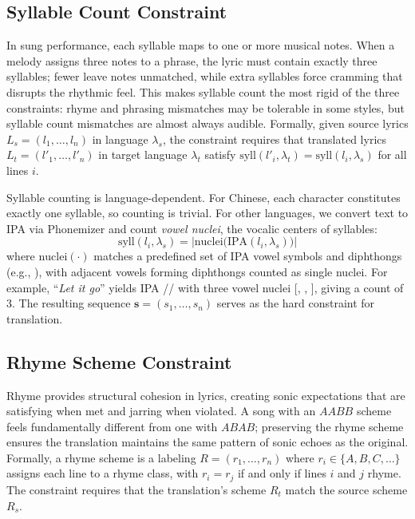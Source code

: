 \documentclass[11pt]{article}
\begin{document}
\subsection{Syllable Count Constraint}
\label{sec:syllable-count}

In sung performance, each syllable maps to one or more musical notes.
When a melody assigns three notes to a phrase, the lyric must contain exactly three syllables; fewer leave notes unmatched, while extra syllables force cramming that disrupts the rhythmic feel.
This makes syllable count the most rigid of the three constraints: rhyme and phrasing mismatches may be tolerable in some styles, but syllable count mismatches are almost always audible.
Formally, given source lyrics $L_s = (l_1, \ldots, l_n)$ in language $\lambda_s$, the constraint requires that translated lyrics $L_t = (l'_1, \ldots, l'_n)$ in target language $\lambda_t$ satisfy $\text{syll}(l'_i, \lambda_t) = \text{syll}(l_i, \lambda_s)$ for all lines $i$.

Syllable counting is language-dependent.
For Chinese, each character constitutes exactly one syllable, so counting is trivial.
For other languages, we convert text to IPA via Phonemizer \citep{bernard-titeux-2021-phonemizer} and count \emph{vowel nuclei}, the vocalic centers of syllables:
\begin{equation}
    \text{syll}(l_i, \lambda_s) = \big|\text{nuclei}\big(\text{IPA}(l_i, \lambda_s)\big)\big|
    \label{eq:syllcount}
\end{equation}
where $\text{nuclei}(\cdot)$ matches a predefined set of IPA vowel symbols and diphthongs (e.g., ), with adjacent vowels forming diphthongs counted as single nuclei.
For example, ``\emph{Let it go}'' yields IPA // with three vowel nuclei [, , ], giving a count of 3.
The resulting sequence $\mathbf{s} = (s_1, \ldots, s_n)$ serves as the hard constraint for translation.

\subsection{Rhyme Scheme Constraint}
\label{sec:rhyme-scheme}

Rhyme provides structural cohesion in lyrics, creating sonic expectations that are satisfying when met and jarring when violated.
A song with an $AABB$ scheme feels fundamentally different from one with $ABAB$; preserving the rhyme scheme ensures the translation maintains the same pattern of sonic echoes as the original.
Formally, a rhyme scheme is a labeling $R = (r_1, \ldots, r_n)$ where $r_i \in \{A, B, C, \ldots\}$ assigns each line to a rhyme class, with $r_i = r_j$ if and only if lines $i$ and $j$ rhyme.
The constraint requires that the translation's scheme $R_t$ match the source scheme $R_s$.
\end{document}
